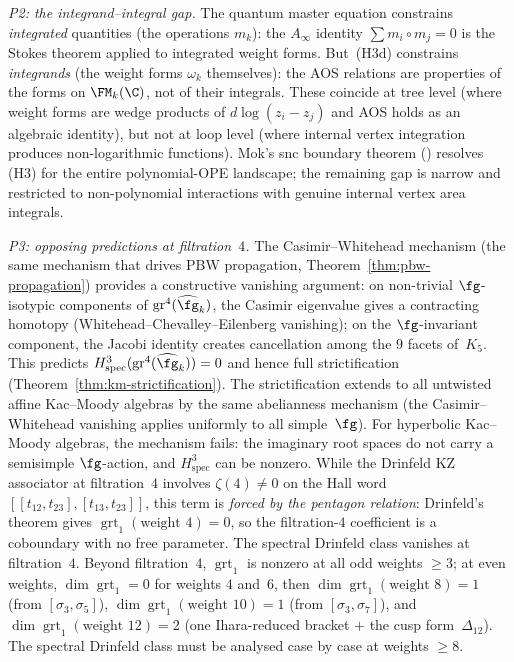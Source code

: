 \begin{remark}
\smallskip
\noindent\emph{P2: the integrand--integral gap.}
The quantum master equation constrains \emph{integrated}
quantities (the operations $m_k$): the $A_\infty$
identity $\sum m_i \circ m_j = 0$ is the Stokes theorem
applied to integrated weight forms. But~(H3d) constrains
\emph{integrands} (the weight forms $\omega_k$ themselves):
the AOS relations are properties of the forms on
$\FM_k(\C)$, not of their integrals. These coincide at
tree level (where weight forms are wedge products of
$d\log(z_i - z_j)$ and AOS holds as an algebraic
identity), but not at loop level (where internal vertex
integration produces non-logarithmic functions).
Mok's snc boundary theorem
\textup{(}\cite[Thm~3.3.1]{Mok25}\textup{)} resolves
(H3) for the entire polynomial-OPE landscape; the
remaining gap is narrow and restricted to non-polynomial
interactions with genuine internal vertex area integrals.

\smallskip
\noindent\emph{P3: opposing predictions at filtration~$4$.}
The Casimir--Whitehead mechanism
\textup{(}the same mechanism that drives PBW propagation,
Theorem~\textup{\ref{thm:pbw-propagation}}\textup{)}
provides a constructive vanishing argument:
on non-trivial $\fg$-isotypic components of
$\operatorname{gr}^4(\widehat{\fg}_k)$,
the Casimir eigenvalue gives a contracting homotopy
(Whitehead--Chevalley--Eilenberg vanishing); on the
$\fg$-invariant component, the Jacobi identity creates
cancellation among the $9$ facets of~$K_5$.
This predicts
$H^3_{\mathrm{spec}}(\operatorname{gr}^4(\widehat{\fg}_k))
= 0$ and hence full strictification
\textup{(}Theorem~\textup{\ref{thm:km-strictification}}\textup{)}.
The strictification extends to all untwisted affine Kac--Moody
algebras by the same abelianness mechanism
(the Casimir--Whitehead vanishing applies uniformly to all
simple~$\fg$). For hyperbolic Kac--Moody algebras,
the mechanism fails: the imaginary root spaces do not carry
a semisimple $\fg$-action, and $H^3_{\mathrm{spec}}$ can
be nonzero.
While the Drinfeld KZ associator at filtration~$4$
involves $\zeta(4) \neq 0$ on the Hall word
$[[t_{12},t_{23}],[t_{13},t_{23}]]$, this term is
\emph{forced by the pentagon relation}: Drinfeld's
theorem gives
$\operatorname{grt}_1(\text{weight }4) = 0$,
so the filtration-$4$ coefficient is a coboundary with
no free parameter. The spectral Drinfeld class vanishes at
filtration~$4$. Beyond filtration~$4$,
$\operatorname{grt}_1$ is nonzero at all odd weights
$\geq 3$; at even weights,
$\dim\operatorname{grt}_1 = 0$ for
weights $4$ and~$6$, then
$\dim\operatorname{grt}_1(\text{weight }8) = 1$
\textup{(}from $[\sigma_3, \sigma_5]$\textup{)},
$\dim\operatorname{grt}_1(\text{weight }10) = 1$
\textup{(}from $[\sigma_3, \sigma_7]$\textup{)}, and
$\dim\operatorname{grt}_1(\text{weight }12) = 2$
\textup{(}one Ihara-reduced bracket $+$ the cusp
form~$\Delta_{12}$\textup{)}.
The spectral Drinfeld class must be analysed
case by case at weights $\geq 8$.
\end{remark}

